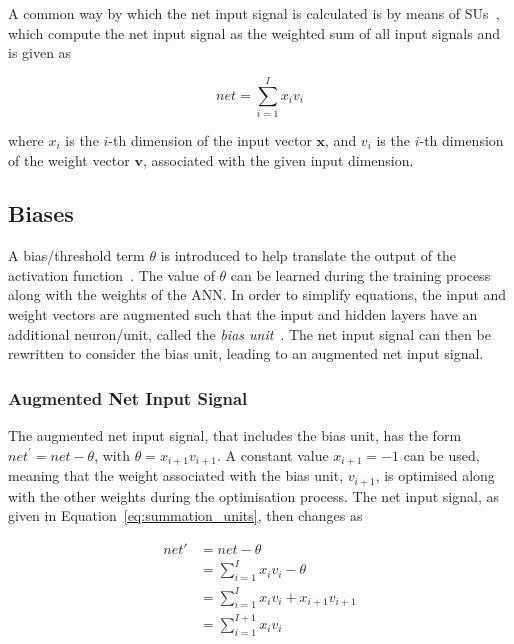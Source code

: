 A common way by which the net input signal is calculated is by means of \acp{SU}~\cite{ref:engelbrecht:2007}, which compute the net input signal as the weighted sum of all input signals and is given as

\begin{equation}
      net = \sum_{i=1}^{I}{x_{i}v_{i}}
      \label{eq:summation_units}
\end{equation}

where $x_{i}$ is the $i$-th dimension of the input vector $\boldsymbol{x}$, and $v_{i}$ is the $i$-th dimension of the weight vector $\boldsymbol{v}$, associated with the given input dimension.


\subsection{Biases}\label{sec:anns:an:biases}

A bias/threshold term $\theta$ is introduced to help translate the output of the activation function~\cite{ref:benitez:1997}. The value of $\theta$ can be learned during the training process along with the weights of the \acs{ANN}. In order to simplify equations, the input and weight vectors are augmented such that the input and hidden layers have an additional neuron/unit, called the \textit{bias unit}~\cite{ref:engelbrecht:2007}. The net input signal can then be rewritten to consider the bias unit, leading to an augmented net input signal.


\subsubsection{Augmented Net Input Signal}\label{sec:anns:an:biases:augmented_net_input_signal}

The augmented net input signal, that includes the bias unit, has the form $net^{'} = net - \theta$, with $\theta = x_{i+1}v_{i+1}$. A constant value $x_{i+1} = -1$ can be used, meaning that the weight associated with the bias unit, $v_{i+1}$, is optimised along with the other weights during the optimisation process. The net input signal, as given in Equation~\eqref{eq:summation_units}, then changes as

\begin{equation}
      \begin{split}
            net{'} & = net - \theta \\
            & = \sum_{i=1}^{I} x_i v_i - \theta\\
            & = \sum_{i=1}^{I} x_i v_i + x_{i+1} v_{i+1} \\
            & = \sum_{i=1}^{I+1} x_i v_i
            \label{eq:augmented_vectors}
      \end{split}
\end{equation}


